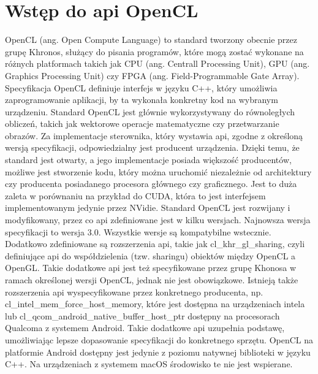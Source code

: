 \section[Wstęp do api OpenCL]{Wstęp do api OpenCL}
OpenCL (ang. Open Compute Language) to standard tworzony obecnie przez grupę Khronos, służący do pisania programów, które mogą zostać wykonane na różnych platformach takich jak CPU (ang. Centrall Processing Unit), GPU (ang. Graphics Processing Unit) czy FPGA (ang. Field-Programmable Gate Array). Specyfikacja OpenCL definiuje interfejs w języku C++, który umożliwia zaprogramowanie aplikacji, by ta wykonała konkretny kod na wybranym urządzeniu. Standard OpenCL jest głównie wykorzystywany do równoległych obliczeń, takich jak wektorowe operacje matematyczne czy przetwarzanie obrazów. Za implementacje sterownika, który wystawia api, zgodne z określoną wersją specyfikacji, odpowiedzialny jest producent urządzenia.  Dzięki temu, że standard jest otwarty, a jego implementacje posiada większość producentów, możliwe jest stworzenie kodu, który można uruchomić niezależnie od architektury czy producenta posiadanego procesora głównego czy graficznego. Jest to duża zaleta w porównaniu na przykład do CUDA, która to jest interfejsem implementowanym jedynie przez NVidie. Standard OpenCL jest rozwijany i modyfikowany, przez co api zdefiniowane jest w kilku wersjach. Najnowsza wersja specyfikacji to wersja 3.0. Wszystkie wersje są kompatybilne wstecznie. Dodatkowo zdefiniowane są rozszerzenia api, takie jak cl\_khr\_gl\_sharing, czyli definiujące api do współdzielenia (tzw. sharingu) obiektów między OpenCL a OpenGL. Takie dodatkowe api jest też specyfikowane przez grupę Khonosa w ramach określonej wersji OpenCL, jednak nie jest obowiązkowe. Istnieją także rozszerzenia api wyspecyfikowane przez konkretnego producenta, np. cl\_intel\_mem\_force\_host\_memory, które jest dostępna na urządzeniach intela lub cl\_qcom\_android\_native\_buffer\_host\_ptr dostępny na procesorach Qualcoma z systemem Android. Takie dodatkowe api uzupełnia podstawę, umożliwiając lepsze dopasowanie specyfikacji do konkretnego sprzętu. OpenCL na platformie Android dostępny jest jedynie z poziomu natywnej biblioteki w języku C++. Na urządzeniach z systemem macOS środowisko te nie jest wspierane.

